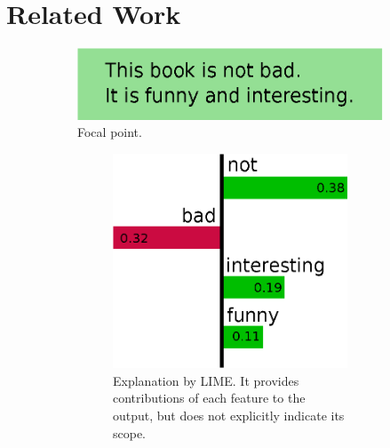 \documentclass[runningheads]{llncs}
\begin{document}
\section{Related Work}
\begin{figure}[t]
	\centering
	\vspace{0.5cm}
	\begin{subfigure}[t]{0.55\textwidth}
		\centering
		\includegraphics[scale=0.35]{example-instance}
		\caption{Focal point.}\label{fig:example-instance}
	\end{subfigure}
	\hfill
	\begin{subfigure}[t]{0.45\textwidth}
		\begin{subfigure}[t]{\textwidth}
			\centering
			\includegraphics[scale=0.35]{example-lime}
			\caption{%
				Explanation by LIME\@.
				It provides contributions of each feature to the output,
				but does not explicitly indicate its scope.
			}\label{fig:example-lime}
			\vspace{0.4cm}
		\end{subfigure}
		\begin{subfigure}[t]{\textwidth}

\end{subfigure}
\end{subfigure}
\end{figure}
\end{document}
